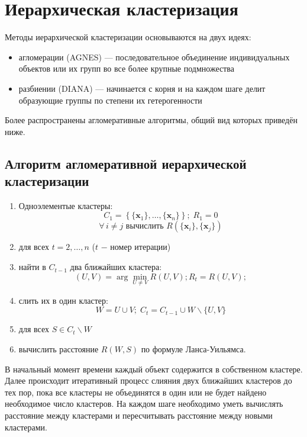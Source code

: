 \documentclass[10pt]{article}
\begin{document}
\section{Иерархическая кластеризация}
	
	Методы иерархической кластеризации основываются на двух идеях:
	\begin{itemize}
		\item агломерации (AGNES) --- последовательное объединение индивидуальных объектов или их групп во все более крупные подмножества
		\item разбиении (DIANA) ---  начинается с корня и на каждом шаге делит образующие группы по степени их гетерогенности
	\end{itemize}

	Более распространены агломеративные алгоритмы, общий вид которых приведён ниже. 

	
	\subsection{Алгоритм агломеративной иерархической кластеризации}
	\begin{enumerate}
		\item Одноэлементые кластеры: $$C_1 = \left\{\{\pmb x_1\}, \dots, \{\pmb x_n\}\right\}; \; R_1 = 0$$ $$\forall\, i \neq j \text{ вычислить } R(\{\pmb x_i\}, \{\pmb x_j\})$$ 
		\item для всех $t = 2, \dots, n$ ($t$ $-$ номер итерации) 
		\item найти в $C_{t-1}$ два ближайших кластера: $$(U, V) = \arg \min_{U \neq V} R(U, V); R_t=R(U, V);$$
		\item слить их в один кластер: $$W = U \cup V; \; C_t = C_{t-1} \cup W \backslash \{U, V\}$$ 
		\item для всех $S \in C_t \backslash W $ 
		\item вычислить расстояние $R(W, S)$ по формуле Ланса-Уильямса.
	\end{enumerate}

В начальный момент времени каждый объект содержится в собственном кластере. Далее происходит итеративный процесс слияния двух ближайших кластеров до тех пор, пока все кластеры не объединятся в один или не будет найдено необходимое число кластеров. На каждом шаге необходимо уметь вычислять расстояние между кластерами и пересчитывать расстояние между новыми кластерами. 
\end{document}
